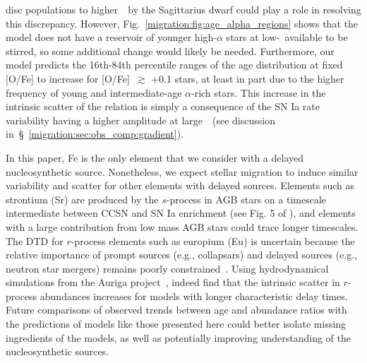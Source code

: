 disc populations to higher~\absz~by the Sagittarius dwarf could play a role in 
resolving this discrepancy. 
However, Fig.~\ref{migration:fig:age_alpha_regions} shows that the model does not have a 
reservoir of younger high-$\alpha$ stars at low-\absz~available to be stirred, 
so some additional change would likely be needed. 
Furthermore, our model predicts the 16th-84th percentile ranges of the age 
distribution at fixed [O/Fe] to increase for [O/Fe]~$\gtrsim$ +0.1 stars, at 
least in part due to the higher frequency of young and intermediate-age 
$\alpha$-rich stars. 
This increase in the intrinsic scatter of the relation is simply a consequence 
of the SN Ia rate variability having a higher amplitude at large~\rgal~(see 
discussion in~\S~\ref{migration:sec:obs_comp:gradient}). 
\par 
In this paper, Fe is the only element that we consider with a delayed 
nucleosynthetic source. 
Nonetheless, we expect stellar migration to induce similar variability and 
scatter for other elements with delayed sources. 
Elements such as strontium (Sr) are produced by the $s$-process in AGB stars on 
a timescale intermediate between CCSN and SN Ia enrichment (see Fig. 5 of 
\citealp{Johnson2020}), and elements with a large contribution from low mass 
AGB stars could trace longer timescales. 
The DTD for $r$-process elements such as europium (Eu) is uncertain because the 
relative importance of prompt sources (e.g., collapsars) and delayed sources 
(e.g., neutron star mergers) remains poorly constrained~\citep{Cote2019, 
Mishenina2019, Siegel2019, Vincenzo2021b}. 
Using hydrodynamical simulations from the Auriga project~\citep{Grand2017}, 
\citet{vandeVoort2020} indeed find that the intrinsic scatter in $r$-process 
abundances increases for models with longer characteristic delay times. 
Future comparisons of observed trends between age and abundance ratios with the 
predictions of models like those presented here could better isolate missing 
ingredients of the models, as well as potentially improving understanding of 
the nucleosynthetic sources. 

